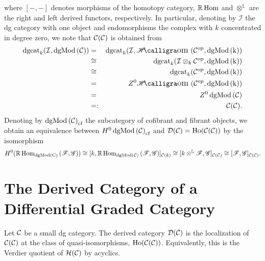 \documentclass[dissertation.tex]{subfiles}
\begin{document}
\begin{rmk}
\begin{itemize}
    where $[-,-]$ denotes morphisms of the homotopy category, $\mathbb{R}\operatorname{Hom}$ and $\otimes^\mathbb{L}$ are the right and left derived functors, respectively.
    In particular, denoting by $\mathcal{I}$ the dg category with one object and endomorphisms the complex with $k$ concentrated in degree zero, we note that $\mathcal{C}(\mathcal{C})$ is obtained from
    \begin{eqnarray*}
      \dgcat{k}(\mathcal{I}, \cdg{\C}) &=& \dgcat{k}(\mathcal{I}, \SHom{\C^\text{op}, \cdg{k}}\\
      &\cong& \dgcat{k}(\mathcal{I} \otimes_k \C^\text{op}, \cdg{k})\\
      &\cong& \dgcat{k}(\C^\text{op}, \cdg{k})\\
      &=& Z^0 \SHom{\C^{op}, \cdg{k}}\\
      &=& Z^0\cdg{\C}\\
      &=:& \mathcal{C}(\C).
    \end{eqnarray*}
    Denoting by $\operatorname{dgMod\left(\mathcal{C}\right)}_\text{cf}$ the subcategory of cofibrant and fibrant objects, we obtain an equivalence between $H^0\operatorname{dgMod\left(\mathcal{C}\right)}_\text{cf}$ and $\mathcal{D}(\mathcal{C}) = \operatorname{Ho}(\mathcal{C}(\mathcal{C}))$ by the isomorphism
    $$H^0(\mathbb{R}\operatorname{Hom}_{\operatorname{dgMod\left(C\right)}}\left(\mathscr{F},\mathscr{G}\right)) \cong [k,\mathbb{R}\operatorname{Hom}_{\operatorname{dgMod\left(\mathcal{C}\right)}}\left(\mathscr{F},\mathscr{G}\right)]_{\mathcal{C}(k)} \cong [k \otimes^\mathbb{L} \mathscr{F}, \mathscr{G}]_{\mathcal{C}(\mathcal{C})} \cong [\mathscr{F},\mathscr{G}]_{\mathcal{C}(\mathcal{C})}.$$
  \end{itemize}
\end{rmk}


\section{The Derived Category of a Differential Graded Category}

\begin{defn}
  Let $\mathcal{C}$ be a small dg category.
  The derived category $\mathcal{D}(\mathcal{C})$ is the localization of $\mathcal{C}(\mathcal{C})$ at the class of quasi-isomorphisms, $\operatorname{Ho}(\mathcal{C}(\mathcal{C}))$.
  Equivalently, this is the Verdier quotient of $\mathcal{H}(\mathcal{C})$ by acyclics.
\end{defn}
\end{document}
